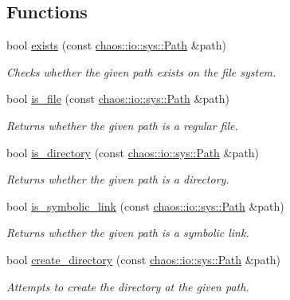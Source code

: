 \subsection*{Functions}
\begin{DoxyCompactItemize}
\item 
bool \hyperlink{namespacechaos_1_1io_1_1sys_ad3693908f4b5615a25242afd013b2da9}{exists} (const \hyperlink{classchaos_1_1io_1_1sys_1_1_path}{chaos\-::io\-::sys\-::\-Path} \&path)
\begin{DoxyCompactList}\small\item\em Checks whether the given path exists on the file system. \end{DoxyCompactList}\item 
bool \hyperlink{namespacechaos_1_1io_1_1sys_aebd1713fea3c99cb2429e60abe5c0d80}{is\-\_\-file} (const \hyperlink{classchaos_1_1io_1_1sys_1_1_path}{chaos\-::io\-::sys\-::\-Path} \&path)
\begin{DoxyCompactList}\small\item\em Returns whether the given path is a regular file. \end{DoxyCompactList}\item 
bool \hyperlink{namespacechaos_1_1io_1_1sys_a9bed6e498770ad91f604b9dc4eead217}{is\-\_\-directory} (const \hyperlink{classchaos_1_1io_1_1sys_1_1_path}{chaos\-::io\-::sys\-::\-Path} \&path)
\begin{DoxyCompactList}\small\item\em Returns whether the given path is a directory. \end{DoxyCompactList}\item 
bool \hyperlink{namespacechaos_1_1io_1_1sys_ac47b8476aea536b08a1c7a34b4e7e28c}{is\-\_\-symbolic\-\_\-link} (const \hyperlink{classchaos_1_1io_1_1sys_1_1_path}{chaos\-::io\-::sys\-::\-Path} \&path)
\begin{DoxyCompactList}\small\item\em Returns whether the given path is a symbolic link. \end{DoxyCompactList}\item 
bool \hyperlink{namespacechaos_1_1io_1_1sys_a6bcdadf916b110395f4a2627c049da11}{create\-\_\-directory} (const \hyperlink{classchaos_1_1io_1_1sys_1_1_path}{chaos\-::io\-::sys\-::\-Path} \&path)
\begin{DoxyCompactList}\small\item\em Attempts to create the directory at the given path. \end{DoxyCompactList}\item 

\end{DoxyCompactItemize}
